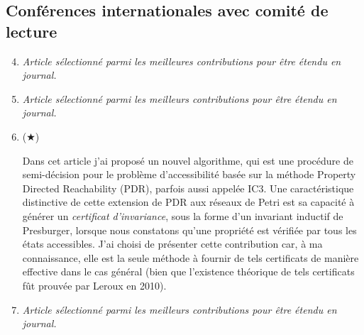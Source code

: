 \subsection*{Conférences internationales avec comité de lecture}
\vspace{10pt}
\begin{enumerate}
  \setcounter{enumi}{3}
  \item  \cite{amat_combination_2021} 
  \smallbreak
  \emph{Article sélectionné parmi les meilleures contributions pour être étendu en journal.}
  \smallbreak
  \item \cite{amat_accelerating_2021} 
  \smallbreak
  \emph{Article sélectionné parmi les meilleurs contributions pour être étendu en journal.}
  \smallbreak
  \item ($\bigstar$) \cite{amat_property_2022} 
  \begin{mdframed}
    Dans cet article j'ai proposé un nouvel algorithme, qui est une procédure de
  semi-décision pour le problème d'accessibilité basée sur la méthode Property
  Directed Reachability (PDR), parfois aussi appelée IC3. Une caractéristique
  distinctive de cette extension de PDR aux réseaux de Petri est sa capacité à
  générer un \emph{certificat d'invariance}, sous la forme d'un invariant
  inductif de Presburger, lorsque nous constatons qu'une propriété est vérifiée
  par tous les états accessibles. J'ai choisi de présenter cette contribution
  car, à ma connaissance, elle est la seule méthode à fournir de tels
  certificats de manière effective dans le cas général (bien que l'existence
  théorique de tels certificats fût prouvée par Leroux en 2010).
  \end{mdframed}
  \smallbreak
  \item \cite{amat_kong_2022} 
  \smallbreak
  \emph{Article sélectionné parmi les meilleurs contributions pour être étendu en journal.}

\end{enumerate}
